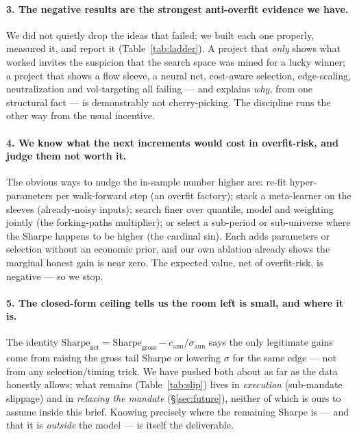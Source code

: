 \documentclass[11pt,a4paper]{article}
\begin{document}
\paragraph{3. The negative results are the strongest anti-overfit evidence we have.} We did not quietly drop the
ideas that failed; we built each one properly, measured it, and report it (Table~\ref{tab:ladder}). A project
that \emph{only} shows what worked invites the suspicion that the search space was mined for a lucky winner; a
project that shows a flow sleeve, a neural net, cost-aware selection, edge-scaling, neutralization and
vol-targeting all failing --- and explains \emph{why}, from one structural fact --- is demonstrably not
cherry-picking. The discipline runs the other way from the usual incentive.

\paragraph{4. We know what the next increments would cost in overfit-risk, and judge them not worth it.} The
obvious ways to nudge the in-sample number higher are: re-fit hyper-parameters per walk-forward step (an
overfit factory); stack a meta-learner on the sleeves (already-noisy inputs); search finer over quantile, model
and weighting jointly (the forking-paths multiplier); or select a sub-period or sub-universe where the Sharpe
happens to be higher (the cardinal sin). Each adds parameters or selection without an economic prior, and our
own ablation already shows the marginal honest gain is near zero. The expected value, net of overfit-risk, is
negative --- so we stop.

\paragraph{5. The closed-form ceiling tells us the room left is small, and where it is.} The identity
$\text{Sharpe}_{\text{net}}=\text{Sharpe}_{\text{gross}}-c_{\text{ann}}/\sigma_{\text{ann}}$ says the only
legitimate gains come from raising the gross tail Sharpe or lowering $\sigma$ for the same edge --- not from any
selection/timing trick. We have pushed both about as far as the data honestly allows; what remains
(Table~\ref{tab:slip}) lives in \emph{execution} (sub-mandate slippage) and in \emph{relaxing the mandate}
(\S\ref{sec:future}), neither of which is ours to assume inside this brief. Knowing precisely where the
remaining Sharpe is --- and that it is \emph{outside} the model --- is itself the deliverable.
\end{document}
